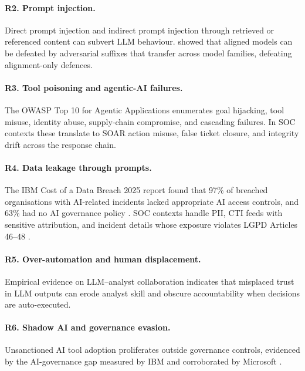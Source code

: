 \documentclass[preprint,12pt,authoryear]{elsarticle}
\begin{document}
\paragraph{R2. Prompt injection.} Direct prompt injection \citep{liu2024formalizing} and indirect prompt injection through retrieved or referenced content \citep{greshake2023indirect} can subvert LLM behaviour. \citet{zou2023universal} showed that aligned models can be defeated by adversarial suffixes that transfer across model families, defeating alignment-only defences.

\paragraph{R3. Tool poisoning and agentic-AI failures.} The OWASP Top 10 for Agentic Applications \citep{owasp2025agentic} enumerates goal hijacking, tool misuse, identity abuse, supply-chain compromise, and cascading failures. In SOC contexts these translate to SOAR action misuse, false ticket closure, and integrity drift across the response chain.

\paragraph{R4. Data leakage through prompts.} The IBM Cost of a Data Breach 2025 report found that 97\% of breached organisations with AI-related incidents lacked appropriate AI access controls, and 63\% had no AI governance policy \citep{ibm2025costbreach}. SOC contexts handle PII, CTI feeds with sensitive attribution, and incident details whose exposure violates LGPD Articles 46--48 \citep{lgpd2018}.

\paragraph{R5. Over-automation and human displacement.} Empirical evidence on LLM--analyst collaboration \citep{llmsoc2025} indicates that misplaced trust in LLM outputs can erode analyst skill and obscure accountability when decisions are auto-executed.

\paragraph{R6. Shadow AI and governance evasion.} Unsanctioned AI tool adoption proliferates outside governance controls, evidenced by the AI-governance gap measured by IBM \citep{ibm2025costbreach} and corroborated by Microsoft \citep{mddr2025}.
\end{document}

